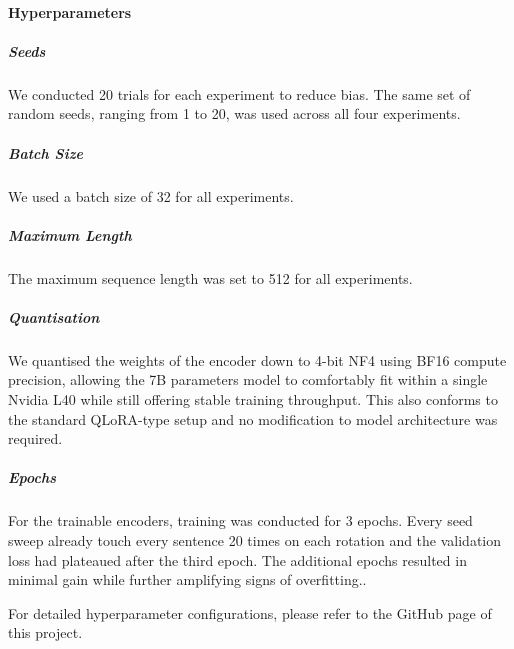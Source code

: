 \documentclass[12pt]{article}
\begin{document}
\paragraph{Hyperparameters}

\subparagraph{Seeds}
We conducted 20 trials for each experiment to reduce bias. 
The same set of random seeds, ranging from 1 to 20, was used across all four experiments.

\subparagraph{Batch Size}
We used a batch size of 32 for all experiments.

\subparagraph{Maximum Length}
The maximum sequence length was set to 512 for all experiments.

\subparagraph{Quantisation}
We quantised the weights of the encoder down to 4-bit NF4 using BF16 compute precision, allowing the 7B parameters model to comfortably fit within a single Nvidia L40 while still offering stable training throughput. This also conforms to the standard QLoRA-type setup and no modification to model architecture was required.

\subparagraph{Epochs}
For the trainable encoders, training was conducted for 3 epochs. Every seed sweep already touch every sentence 20 times on each rotation and the validation loss had plateaued after the third epoch. The additional epochs resulted in minimal gain while further amplifying signs of overfitting..

For detailed hyperparameter configurations, please refer to the GitHub page of this project.

\end{document}
